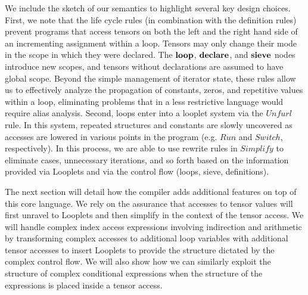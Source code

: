 We include the sketch of our semantics to highlight several key design choices.
%
First, we note that the life cycle rules (in combination with the definition rules) prevent programs that access tensors on both the left and the right hand side of an incrementing assignment within a loop.
%
Tensors may only change their mode in the scope in which they were declared.
%
The $\text{\textbf{loop}}$, $\text{\textbf{declare}}$, and $\text{\textbf{sieve}}$ nodes introduce new scopes, and tensors without declarations
are assumed to have global scope.
%
Beyond the simple management of iterator state, these rules allow us to effectively analyze the propagation of constants, zeros, and repetitive values within a loop, eliminating problems that in a less restrictive language would require alias analysis.
%
%
Second, loops enter into a looplet system via the $Unfurl$ rule.
%
In this system, repeated structures and constants are slowly uncovered as accesses are lowered in various points in the program (e.g. $Run$  and $Switch$, respectively).
%
In this process, we are able to use rewrite rules in $Simplify$ to eliminate cases, unnecessary iterations, and so forth based on the information provided via Looplets and via the control flow (loops, sieve, definitions).
%


The next section will detail how the compiler adds additional features on top of this core language.  
We rely on the assurance that accesses to tensor values will first unravel to Looplets and then simplify in the context of the tensor access.
%
We will handle complex index access expressions involving indirection and arithmetic by transforming complex accesses to additional loop variables with additional tensor accesses to insert Looplets to provide the structure dictated by the complex control flow.
%
We will also show how we can similarly exploit the structure of complex conditional expressions when the structure of the expressions is placed inside a tensor access.





